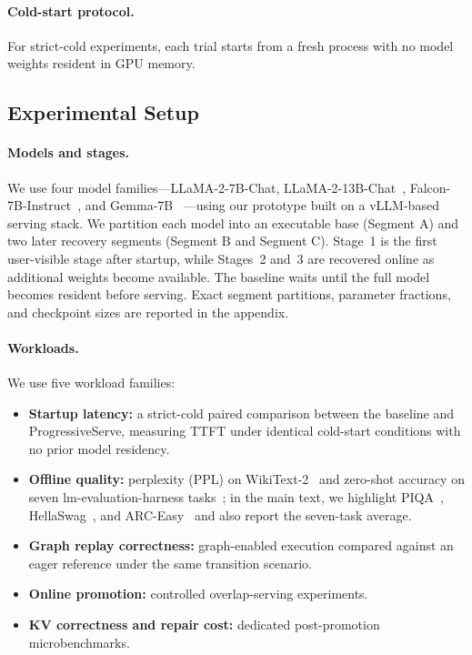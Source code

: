 \documentclass[sigplan,anonymous,review,nonacm]{acmart}
\begin{document}
\paragraph{Cold-start protocol.}
For strict-cold experiments, each trial starts from a fresh process with no model weights resident in GPU memory.

\subsection{Experimental Setup}

\paragraph{Models and stages.}
We use four model families---LLaMA-2-7B-Chat, LLaMA-2-13B-Chat~\cite{touvron2023llama2}, Falcon-7B-Instruct~\cite{almazrouei2023falcon}, and Gemma-7B~\cite{gemmateam2024gemma}
---using our prototype built on a vLLM-based serving stack. We partition each model into an executable base (Segment A) and two later recovery segments (Segment B and Segment C). Stage~1 is the first user-visible stage after startup, while Stages~2 and~3 are recovered online as additional weights become available. The baseline waits until the full model becomes resident before serving. Exact segment partitions, parameter fractions, and checkpoint sizes are reported in the appendix.


\paragraph{Workloads.}
We use five workload families:
\begin{itemize}
    \item \textbf{Startup latency:} a strict-cold paired comparison between the baseline and ProgressiveServe, measuring TTFT under identical cold-start conditions with no prior model residency.
    \item \textbf{Offline quality:} perplexity (PPL) on WikiText-2~\cite{merity2016wikitext} and zero-shot accuracy on seven lm-evaluation-harness tasks~\cite{eval-harness}; in the main text, we highlight PIQA~\cite{bisk2020piqa}, HellaSwag~\cite{zellers2019hellaswag}, and ARC-Easy~\cite{clark2018arc} and also report the seven-task average.
    \item \textbf{Graph replay correctness:} graph-enabled execution compared against an eager reference under the same transition scenario.
    \item \textbf{Online promotion:} controlled overlap-serving experiments.
    \item \textbf{KV correctness and repair cost:} dedicated post-promotion microbenchmarks.
\end{itemize}
\end{document}
